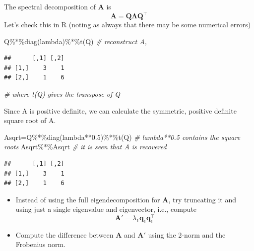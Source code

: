 \documentclass[
]{book}
\newenvironment{Shaded}{\begin{snugshade}}{\end{snugshade}}
\newcommand{\CommentTok}[1]{\textcolor[rgb]{0.56,0.35,0.01}{\textit{#1}}}
\newcommand{\FloatTok}[1]{\textcolor[rgb]{0.00,0.00,0.81}{#1}}
\newcommand{\FunctionTok}[1]{\textcolor[rgb]{0.00,0.00,0.00}{#1}}
\newcommand{\NormalTok}[1]{#1}
\newcommand{\OtherTok}[1]{\textcolor[rgb]{0.56,0.35,0.01}{#1}}
\newcommand{\SpecialCharTok}[1]{\textcolor[rgb]{0.00,0.00,0.00}{#1}}
\providecommand{\tightlist}{%
  \setlength{\itemsep}{0pt}\setlength{\parskip}{0pt}}
\theoremstyle{definition}
\theoremstyle{definition}
\theoremstyle{definition}
\theoremstyle{definition}
\theoremstyle{remark}
\begin{document}
The spectral decomposition of \(\mathbf A\) is
\[\mathbf A= \mathbf Q\boldsymbol \Lambda\mathbf Q^\top\]
Let's check this in R (noting as always that there may be some numerical errors)

\begin{Shaded}
\begin{Highlighting}[]
\NormalTok{Q}\SpecialCharTok{\%*\%}\FunctionTok{diag}\NormalTok{(lambda)}\SpecialCharTok{\%*\%}\FunctionTok{t}\NormalTok{(Q)          }\CommentTok{\# reconstruct A,}
\end{Highlighting}
\end{Shaded}

\begin{verbatim}
##      [,1] [,2]
## [1,]    3    1
## [2,]    1    6
\end{verbatim}

\begin{Shaded}
\begin{Highlighting}[]
                                   \CommentTok{\# where t(Q) gives the transpose of Q}
\end{Highlighting}
\end{Shaded}

Since A is positive definite, we can calculate the symmetric, positive definite square root of A.

\begin{Shaded}
\begin{Highlighting}[]
\NormalTok{Asqrt}\OtherTok{=}\NormalTok{Q}\SpecialCharTok{\%*\%}\FunctionTok{diag}\NormalTok{(lambda}\SpecialCharTok{**}\FloatTok{0.5}\NormalTok{)}\SpecialCharTok{\%*\%}\FunctionTok{t}\NormalTok{(Q) }\CommentTok{\# lambda**0.5 contains the square roots}
\NormalTok{Asqrt}\SpecialCharTok{\%*\%}\NormalTok{Asqrt                      }\CommentTok{\# it is seen that A is recovered}
\end{Highlighting}
\end{Shaded}

\begin{verbatim}
##      [,1] [,2]
## [1,]    3    1
## [2,]    1    6
\end{verbatim}

\begin{itemize}
\tightlist
\item
  Instead of using the full eigendecomposition for \(\mathbf A\), try truncating it and using just a single eigenvalue and eigenvector, i.e., compute
  \[\mathbf A' = \lambda_1 \mathbf q_1 \mathbf q_1^\top\]
\item
  Compute the difference between \(\mathbf A\) and \(\mathbf A'\) using the 2-norm and the Frobenius norm.
\end{itemize}
\end{document}
